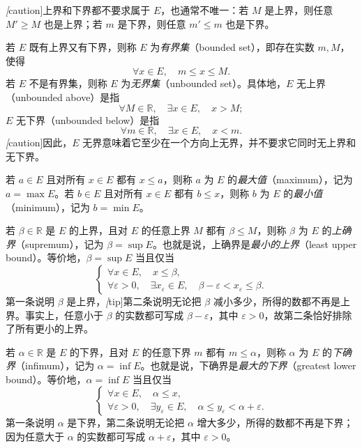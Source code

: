 \documentclass[UTF8,12pt,a4paper,fontset=fandol]{ctexbook}
\begin{document}
\emph[caution]{上界和下界都不要求属于 $E$，也通常不唯一}：若 $M$ 是上界，则任意 $M'\geq M$ 也是上界；若 $m$ 是下界，则任意 $m'\leq m$ 也是下界。

\begin{definition}
\label{def:bounded-and-unbounded-sets}
若 $E$ 既有上界又有下界，则称 $E$ 为\emph{有界集}（bounded set），即存在实数 $m,M$，使得
\[
    \forall x\in E,\quad m\leq x\leq M.
\]
若 $E$ 不是有界集，则称 $E$ 为\emph{无界集}（unbounded set）。具体地，$E$ 无上界（unbounded above）是指
\[
    \forall M\in\mathbb{R},\quad \exists x\in E,\quad x>M;
\]
$E$ 无下界（unbounded below）是指
\[
    \forall m\in\mathbb{R},\quad \exists x\in E,\quad x<m.
\]
\emph[caution]{因此，$E$ 无界意味着它至少在一个方向上无界，并不要求它同时无上界和无下界。}
\end{definition}

\begin{definition}
\label{def:maximum-and-minimum}
若 $a\in E$ 且对所有 $x\in E$ 都有 $x\leq a$，则称 $a$ 为 $E$ 的\emph{最大值}（maximum），记为 $a=\max E$。若 $b\in E$ 且对所有 $x\in E$ 都有 $b\leq x$，则称 $b$ 为 $E$ 的\emph{最小值}（minimum），记为 $b=\min E$。
\end{definition}

\begin{definition}
\label{def:supremum}
若 $\beta\in\mathbb{R}$ 是 $E$ 的上界，且对 $E$ 的任意上界 $M$ 都有 $\beta\leq M$，则称 $\beta$ 为 $E$ 的\emph{上确界}（supremum），记为 $\beta=\sup E$。也就是说，上确界是\emph{最小的上界}（least upper bound）。等价地，$\beta=\sup E$ 当且仅当
\[
    \begin{cases}
        \forall x\in E,\quad x\leq\beta,\\
        \forall\varepsilon>0,\quad \exists x_{\varepsilon}\in E,\quad
        \beta-\varepsilon<x_{\varepsilon}\leq\beta.
    \end{cases}
\]
第一条说明 $\beta$ 是上界，\emph[tip]{第二条说明无论把 $\beta$ 减小多少，所得的数都不再是上界}。事实上，任意小于 $\beta$ 的实数都可写成 $\beta-\varepsilon$，其中 $\varepsilon>0$，故第二条恰好排除了所有更小的上界。
\end{definition}

\begin{definition}
\label{def:infimum}
若 $\alpha\in\mathbb{R}$ 是 $E$ 的下界，且对 $E$ 的任意下界 $m$ 都有 $m\leq\alpha$，则称 $\alpha$ 为 $E$ 的\emph{下确界}（infimum），记为 $\alpha=\inf E$。也就是说，下确界是\emph{最大的下界}（greatest lower bound）。等价地，$\alpha=\inf E$ 当且仅当
\[
    \begin{cases}
        \forall x\in E,\quad \alpha\leq x,\\
        \forall\varepsilon>0,\quad \exists y_{\varepsilon}\in E,\quad
        \alpha\leq y_{\varepsilon}<\alpha+\varepsilon.
    \end{cases}
\]
第一条说明 $\alpha$ 是下界，第二条说明无论把 $\alpha$ 增大多少，所得的数都不再是下界；因为任意大于 $\alpha$ 的实数都可写成 $\alpha+\varepsilon$，其中 $\varepsilon>0$。
\end{definition}
\end{document}
